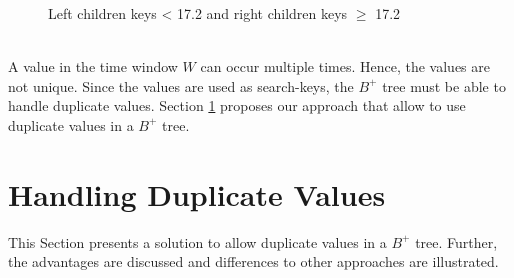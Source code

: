 \documentclass[abstracton,12pt]{scrreprt}
\begin{document}
\begin{figure}[ht!]
	\centering
	\vspace{2mm}
	\caption{Left children keys < 17.2 and right children keys $\geq$ 17.2}
	\label{fig:BTreeBook}
\end{figure} 
\\A value in the time window $W$ can occur multiple times. Hence, the values are not unique. Since the values are used as search-keys, the $B^+$ tree must be able to handle duplicate values. Section \ref{sec:allowDV} proposes our approach that allow to use duplicate values in a $B^+$ tree. 

\section{Handling Duplicate Values}
\label{sec:allowDV}
This Section presents a solution to allow duplicate values in a $B^+$ tree. Further, the advantages are discussed and  differences to other approaches are illustrated. 
\end{document}
